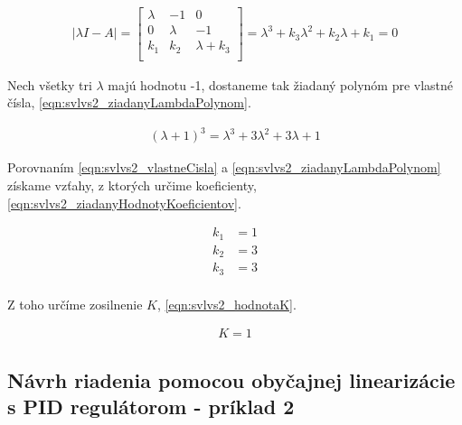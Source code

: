 \documentclass[../main.tex]{subfiles}
\begin{document}
	\begin{equation}
		\begin{aligned}
		|\lambda I-A| =
			\begin{bmatrix} 
			\lambda & -1 & 0 \\ 
			0 & \lambda & -1 \\ 
			k_1 & k_2 & \lambda+k_3  \\ 
			\end{bmatrix} = \lambda^3 + k_3 \lambda^2 +  k_2 \lambda + k_1 = 0
		\end{aligned}
		\label{eqn:svlvs2_vlastneCisla}
	\end{equation}

Nech všetky tri $\lambda$ majú hodnotu -1, dostaneme tak žiadaný polynóm pre vlastné čísla, \cref{eqn:svlvs2_ziadanyLambdaPolynom}.

	\begin{equation}
		\begin{aligned}
		(\lambda+1)^3 = \lambda^3 + 3 \lambda^2 +  3 \lambda + 1
		\end{aligned}
		\label{eqn:svlvs2_ziadanyLambdaPolynom}
	\end{equation}

Porovnaním \cref{eqn:svlvs2_vlastneCisla} a \cref{eqn:svlvs2_ziadanyLambdaPolynom} získame vzťahy, z ktorých určime koeficienty, \cref{eqn:svlvs2_ziadanyHodnotyKoeficientov}.

	\begin{equation}
		\begin{aligned}
		k_1 &= 1 							\\
		k_2 &= 3 							\\
		k_3 &= 3					 		\\
		\end{aligned}
		\label{eqn:svlvs2_ziadanyHodnotyKoeficientov}
	\end{equation}

Z toho určíme zosilnenie $K$, \cref{eqn:svlvs2_hodnotaK}.

	\begin{equation}
		\begin{aligned}
		K = 1
		\end{aligned}
		\label{eqn:svlvs2_hodnotaK}
	\end{equation}

\newpage
\subsection*{Návrh riadenia pomocou obyčajnej linearizácie s PID regulátorom - príklad 2}
\end{document}
